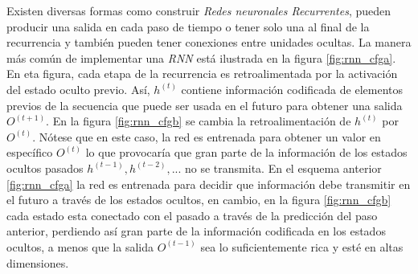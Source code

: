 Existen diversas formas como construir \textit{Redes neuronales Recurrentes}, pueden producir una
salida en cada paso de tiempo o tener solo una al final de la recurrencia  y también pueden tener
conexiones entre unidades ocultas. La manera más común de implementar una \textit{RNN} está ilustrada en la
figura \ref{fig:rnn_cfga}. En eta figura, cada etapa de la recurrencia es retroalimentada por la
activación del estado oculto previo. Así, $h^{(t)}$ contiene información codificada de elementos
previos de la secuencia que puede ser usada en el futuro para obtener una salida $O^{(t+1)}$. En la
figura \ref{fig:rnn_cfgb} se
cambia la retroalimentación de $h^{(t)}$ por $O^{(t)}$. Nótese que en este caso, la red es entrenada
para obtener un valor en específico $O^{(t)}$ lo que provocaría que gran parte de la información de
los estados ocultos pasados $h^{(t-1)}, h^{(t-2)}, ...$ no se transmita. En el esquema anterior
\ref{fig:rnn_cfga} la red es entrenada para decidir que información debe transmitir en el futuro a través
de los estados ocultos, en cambio, en la figura \ref{fig:rnn_cfgb} cada estado esta conectado con el
pasado a través de la predicción del paso anterior, perdiendo así gran parte de la información
codificada en los estados ocultos, a menos que la salida $O^{(t-1)}$ sea lo suficientemente rica y
esté en altas dimensiones.


